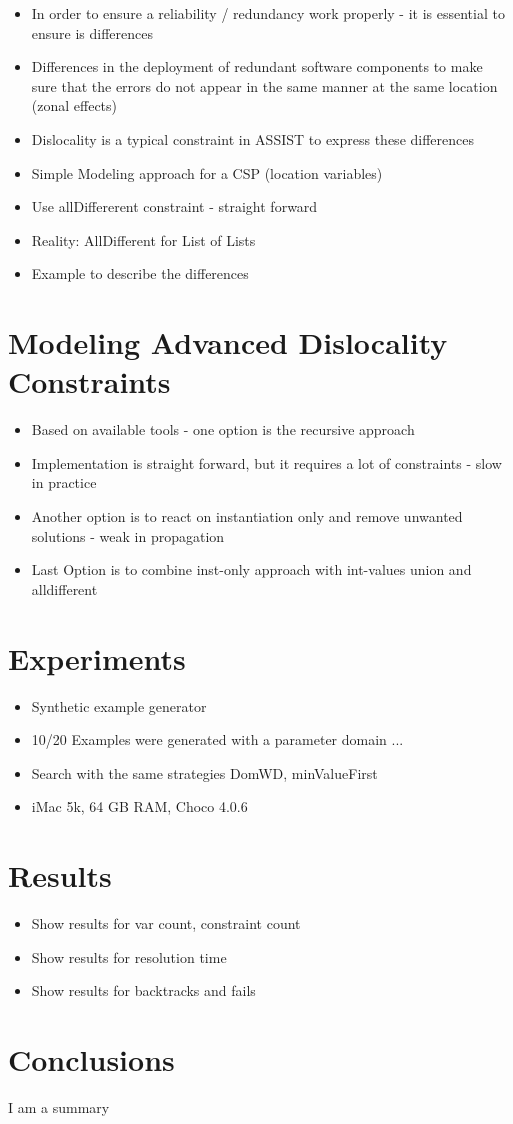 \documentclass[english,biblatex]{lni}
\begin{document}
\begin{itemize}
\item In order to ensure a reliability / redundancy work properly - it is essential to ensure is differences
\item Differences in the deployment of redundant software components to make sure that the errors do not appear in the same manner at the same location (zonal effects)
\item Dislocality is a typical constraint in ASSIST to express these differences
\item Simple Modeling approach for a CSP (location variables)
\item Use allDiffererent constraint - straight forward
\item Reality: AllDifferent for List of Lists
\item Example to describe the differences
\end{itemize}

\section{Modeling Advanced Dislocality Constraints}

\begin{itemize}
\item Based on available tools - one option is the recursive approach
\item Implementation is straight forward, but it requires a lot of constraints - slow in practice
\item Another option is to react on instantiation only and remove unwanted solutions - weak in propagation
\item Last Option is to combine inst-only approach with int-values union and alldifferent
\end{itemize}

\section{Experiments}

\begin{itemize}
\item Synthetic example generator 
\item 10/20 Examples were generated with a parameter domain ...
\item Search with the same strategies DomWD, minValueFirst
\item iMac 5k, 64 GB RAM, Choco 4.0.6
\end{itemize}

\section{Results}

\begin{itemize}
\item Show results for var count, constraint count
\item Show results for resolution time
\item Show results for backtracks and fails
\end{itemize}

\section{Conclusions}

I am a summary

\printbibliography[heading=bibintoc]
\end{document}
